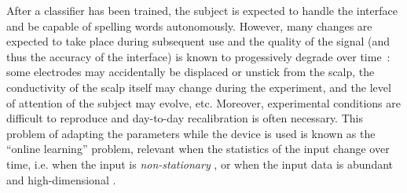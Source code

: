 \documentclass[conference]{IEEEtran}
\begin{document}
After a classifier has been trained, the subject is expected to handle the interface and be capable
of spelling words autonomously.
However, many changes are expected to take place during subsequent use and
the quality of the signal (and 
thus the accuracy of the interface) is known to progessively degrade over time~:
some electrodes may accidentally be displaced or unstick from the scalp, the conductivity of the scalp itself 
may change during the experiment, 
and the level of attention of the subject may evolve, etc. Moreover, experimental 
conditions are difficult to reproduce
and day-to-day recalibration is often necessary.
This problem of adapting the parameters while the device is used 
is known as the ``online learning'' problem, relevant when the statistics of the input change over time, i.e. when 
the input is \emph{non-stationary} \cite{Kivinen08}, or
when the input data is abundant and high-dimensional \cite{Bottou03}.
\end{document}
